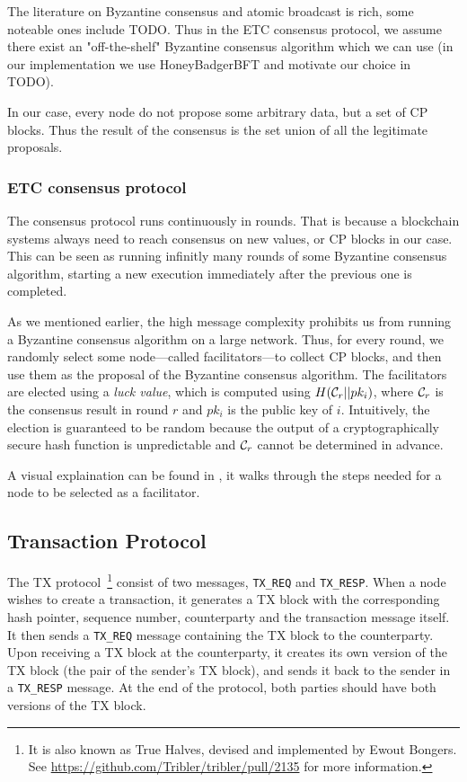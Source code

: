 The literature on Byzantine consensus and atomic broadcast is rich, some noteable ones include TODO.
Thus in the ETC consensus protocol, we assume there exist an "off-the-shelf" Byzantine consensus algorithm which we can use
(in our implementation we use HoneyBadgerBFT and motivate our choice in TODO).

In our case, every node do not propose some arbitrary data, but a set of CP blocks.
Thus the result of the consensus is the set union of all the legitimate proposals.

\subsubsection*{ETC consensus protocol} 
The consensus protocol runs continuously in rounds.
That is because a blockchain systems always need to reach consensus on new values, or CP blocks in our case.
This can be seen as running infinitly many rounds of some Byzantine consensus algorithm,
starting a new execution immediately after the previous one is completed.

As we mentioned earlier, the high message complexity prohibits us from running a Byzantine consensus algorithm on a large network.
Thus, for every round, we randomly select some node---called facilitators---to collect CP blocks,
and then use them as the proposal of the Byzantine consensus algorithm.
The facilitators are elected using a \emph{luck value}, which is computed using $H(\mathcal{C}_r || pk_i)$,
where $\mathcal{C}_r$ is the consensus result in round $r$ and $pk_i$ is the public key of $i$.
Intuitively, the election is guaranteed to be random 
because the output of a cryptographically secure hash function is unpredictable and $\mathcal{C}_r$ cannot be determined in advance.

A visual explaination can be found in ,
it walks through the steps needed for a node to be selected as a facilitator.

\subsection{Transaction Protocol}
The TX protocol~\footnote{It is also known as True Halves, devised and implemented by Ewout Bongers.
See \url{https://github.com/Tribler/tribler/pull/2135} for more information.}
consist of two messages, \texttt{TX\_REQ} and \texttt{TX\_RESP}.
When a node  wishes to create a transaction,
it generates a TX block with the corresponding hash pointer, sequence number, counterparty and the transaction message itself.
It then sends a \texttt{TX\_REQ} message containing the TX block to the counterparty.
Upon receiving a TX block at the counterparty, it creates its own version of the TX block (the pair of the sender's TX block),
and sends it back to the sender in a \texttt{TX\_RESP} message.
At the end of the protocol, both parties should have both versions of the TX block.

